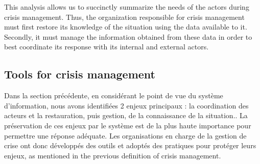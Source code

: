 This analysis allows us to succinctly summarize the needs of the actors during crisis management.
Thus, the organization responsible for crisis management must first restore its knowledge of the situation using the data available to it.
Secondly, it must manage the information obtained from these data in order to best coordinate its response with its internal and external actors.

\subsection{Tools for crisis management}
Dans la section précédente, en considérant le point de vue du système d'information, nous avons identifiées 2 enjeux principaux : la coordination des acteurs et la restauration, puis gestion, de la connaissance de la situation..
La préservation de ces enjeux par le système est de la plus haute importance pour permettre une réponse adéquate.
Les organisations en charge de la gestion de crise ont donc développés des outils et adoptés des pratiques pour protéger leurs enjeux, as mentioned in the previous definition of crisis management.

